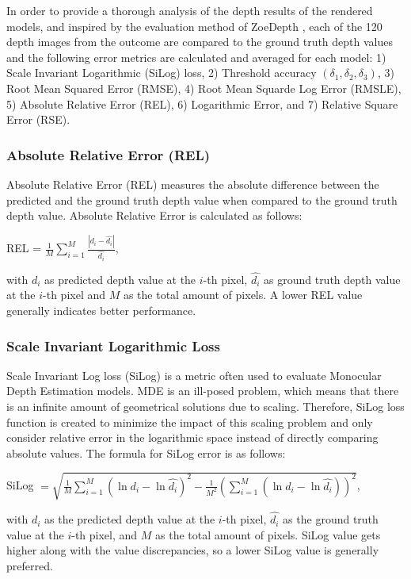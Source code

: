 In order to provide a thorough analysis of the depth results of the rendered models, and inspired by the evaluation method of ZoeDepth \parencite{ZoeDepth}, each of the 120 depth images from the outcome are compared to the ground truth depth values and the following error metrics are calculated and averaged for each model: 1) Scale Invariant Logarithmic (SiLog) loss, 2) Threshold accuracy \((\delta_1, \delta_2, \delta_3)\), 3) Root Mean Squared Error (RMSE), 4) Root Mean Squarde Log Error (RMSLE), 5) Absolute Relative Error (REL), 6) Logarithmic Error, and 7) Relative Square Error (RSE).

\subsubsection{Absolute Relative Error (REL)}

Absolute Relative Error (REL) measures the absolute difference between the predicted and the ground truth depth value when compared to the ground truth depth value. Absolute Relative Error is calculated as follows:

\begin{center}
    REL = \(\frac{1}{M} \sum\limits_{i = 1}^{M} \frac{|d_i - \hat{d_i}|}{\hat{d_i}}\),
\end{center}
with \(d_i\) as predicted depth value at the \(i\)-th pixel, \(\hat{d_i}\) as ground truth depth value at the \(i\)-th pixel and \(M\) as the total amount of pixels. A lower REL value generally indicates better performance.

\subsubsection{Scale Invariant Logarithmic Loss}

Scale Invariant Log loss (SiLog) is a metric often used to evaluate Monocular Depth Estimation models. MDE is an ill-posed problem, which means that there is an infinite amount of geometrical solutions due to scaling. Therefore, SiLog loss function is created to minimize the impact of this scaling problem and only consider relative error in the logarithmic space instead of directly comparing absolute values. The formula for SiLog error is as follows:

\begin{center}
    SiLog \(= \sqrt{\frac{1}{M} \sum\limits_{i = 1}^{M}(\ln d_i - \ln \hat{d_i})^2 - \frac{1}{M^2} (\sum\limits_{i = 1}^{M} (\ln d_i - \ln \hat{d_i}))^2}\),
\end{center}
with \(d_i\) as the predicted depth value at the \(i\)-th pixel, \(\hat{d_i}\) as the ground truth value at the \(i\)-th pixel, and \(M\) as the total amount of pixels. SiLog value gets higher along with the value discrepancies, so a lower SiLog value is generally preferred.

